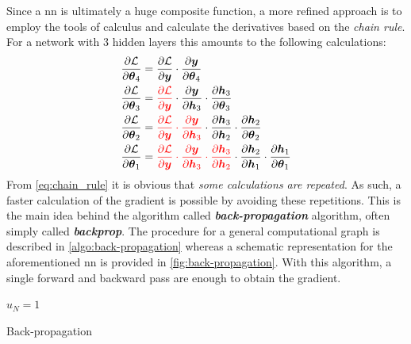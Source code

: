 Since a \gls{nn} is ultimately a huge composite function, a more refined approach is to employ the tools of
calculus and calculate the derivatives based on the \emph{chain
rule}. For a network with \num{3} hidden layers this amounts
to the following calculations:
\begin{equation}
	\label{eq:chain_rule}
	\begin{aligned}
		\pdpl{4} &=
		\pdyl \cdot \pdf{\vc{y}}{\bst{4}} \\
		\pdpl{3} &= \textcolor{red}{\pdyl} \cdot \pdhy \cdot \pdph{3}{3} \\
		\pdpl{2} &= \textcolor{red}{\pdyl \cdot \pdhy} \cdot \pdhh{2}{3} \cdot \pdph{2}{2} \\
		\pdpl{1} &= \textcolor{red}{\pdyl \cdot \pdhy \cdot \pdhh{2}{3}} \cdot
		\pdhh{1}{2} \cdot \pdph{1}{1}
	\end{aligned}
\end{equation}
From \Equation{} \ref{eq:chain_rule} it is obvious that \emph{some calculations
are repeated}. As such, a faster calculation of the gradient is possible by
avoiding these repetitions. This is the main idea behind the algorithm called
\emph{\textbf{back-propagation}} algorithm, often simply
called \emph{\textbf{backprop}}. The procedure for a general computational graph
is described in \Algorithm{} \ref{algo:back-propagation} whereas a schematic
representation for the aforementioned \gls{nn} is provided in \Figure{}
\ref{fig:back-propagation}. With this algorithm, a single forward and backward
pass are enough to obtain the gradient.

\begin{algorithm}[H]
	\BlankLine
	$u_N = 1$\;
	\caption[Back-propagation]{Back-propagation
	\parencite{Rumelhart1986}}
	\label{algo:back-propagation}
\end{algorithm}

